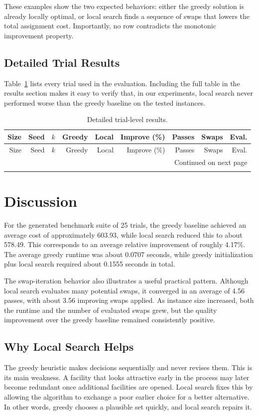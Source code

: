 \documentclass[11pt]{article}
\begin{document}
These examples show the two expected behaviors: either the greedy solution is already locally optimal, or local search finds a sequence of swaps that lowers the total assignment cost. Importantly, no row contradicts the monotonic improvement property.

\subsection{Detailed Trial Results}
Table~\ref{tab:detailed} lists every trial used in the evaluation. Including the full table in the results section makes it easy to verify that, in our experiments, local search never performed worse than the greedy baseline on the tested instances.

\begin{longtable}{rrrrrrrrr}
\caption{Detailed trial-level results.}\label{tab:detailed}\\
\toprule
Size & Seed & $k$ & Greedy & Local & Improve (\%) & Passes & Swaps & Eval. \\
\midrule
\endfirsthead
\toprule
Size & Seed & $k$ & Greedy & Local & Improve (\%) & Passes & Swaps & Eval. \\
\midrule
\endhead
\midrule
\multicolumn{9}{r}{Continued on next page} \\
\endfoot
\bottomrule
\endlastfoot

\end{longtable}

\section{Discussion}
For the generated benchmark suite of 25 trials, the greedy baseline achieved an average cost of approximately 603.93, while local search reduced this to about 578.49. This corresponds to an average relative improvement of roughly 4.17\%. The average greedy runtime was about 0.0707 seconds, while greedy initialization plus local search required about 0.1555 seconds in total.

The swap-iteration behavior also illustrates a useful practical pattern. Although local search evaluates many potential swaps, it converged in an average of 4.56 passes, with about 3.56 improving swaps applied. As instance size increased, both the runtime and the number of evaluated swaps grew, but the quality improvement over the greedy baseline remained consistently positive.

\subsection{Why Local Search Helps}
The greedy heuristic makes decisions sequentially and never revises them. This is its main weakness. A facility that looks attractive early in the process may later become redundant once additional facilities are opened. Local search fixes this by allowing the algorithm to exchange a poor earlier choice for a better alternative. In other words, greedy chooses a plausible set quickly, and local search repairs it.
\end{document}
